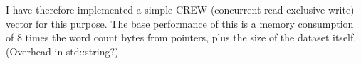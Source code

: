 I have therefore implemented a simple CREW (concurrent read exclusive write)
vector for this purpose. The base performance of this is a memory consumption
of 8 times the word count bytes from pointers, plus the size of the dataset
itself. (Overhead in std::string?)
\begin{landscape}
    \begin{figure}[!h]
\end{figure}
\end{landscape}
